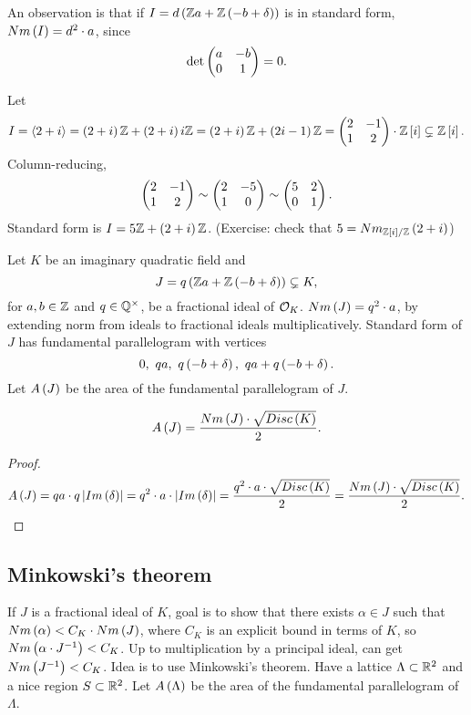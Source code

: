 An observation is that if $ I = d\left( \mathbb{Z} a + \mathbb{Z}\left( -b + \delta \right) \right) $ is in standard form, $ Nm\left( I \right) = d^2 \cdot a $, since
$$ \det\begin{pmatrix} a & -b \\ 0 & 1 \end{pmatrix} = 0. $$

\pagebreak


\begin{example*}
Let
$$ I = \left\langle 2 + i \right\rangle = \left( 2 + i \right)\mathbb{Z} + \left( 2 + i \right)i\mathbb{Z} = \left( 2 + i \right)\mathbb{Z} + \left( 2i - 1 \right)\mathbb{Z} = \begin{pmatrix} 2 & -1 \\ 1 & 2 \end{pmatrix} \cdot \mathbb{Z}\left[ i \right] \subsetneq \mathbb{Z}\left[ i \right]. $$
Column-reducing,
$$ \begin{pmatrix} 2 & -1 \\ 1 & 2 \end{pmatrix} \sim \begin{pmatrix} 2 & -5 \\ 1 & 0 \end{pmatrix} \sim \begin{pmatrix} 5 & 2 \\ 0 & 1 \end{pmatrix}. $$
Standard form is $ I = 5\mathbb{Z} + \left( 2 + i \right)\mathbb{Z} $. (Exercise: check that $ 5 = Nm_{\mathbb{Z}\left[ i \right] / \mathbb{Z}}\left( 2 + i \right) $)
\end{example*}

Let $ K $ be an imaginary quadratic field and
$$ J = q\left( \mathbb{Z} a + \mathbb{Z}\left( -b + \delta \right) \right) \subsetneq K, $$
for $ a, b \in \mathbb{Z} $ and $ q \in \mathbb{Q}^\times $, be a fractional ideal of $ \mathcal{O}_K $. $ Nm\left( J \right) = q^2 \cdot a $, by extending norm from ideals to fractional ideals multiplicatively. Standard form of $ J $ has fundamental parallelogram with vertices
$$ 0, \ qa, \ q\left( -b + \delta \right), \ qa + q\left( -b + \delta \right). $$
Let $ A\left( J \right) $ be the area of the fundamental parallelogram of $ J $.

\begin{proposition}
$$ A\left( J \right) = \dfrac{Nm\left( J \right) \cdot \sqrt{Disc\left( K \right)}}{2}. $$
\end{proposition}

\begin{proof}
$$ A\left( J \right) = qa \cdot q\left\lvert Im\left( \delta \right) \right\rvert = q^2 \cdot a \cdot \left\lvert Im\left( \delta \right) \right\rvert = \dfrac{q^2 \cdot a \cdot \sqrt{Disc\left( K \right)}}{2} = \dfrac{Nm\left( J \right) \cdot \sqrt{Disc\left( K \right)}}{2}. $$
\end{proof}

\subsection{Minkowski's theorem}

If $ J $ is a fractional ideal of $ K $, goal is to show that there exists $ \alpha \in J $ such that $ Nm\left( \alpha \right) < C_K \cdot Nm\left( J \right) $, where $ C_K $ is an explicit bound in terms of $ K $, so $ Nm\left( \alpha \cdot J^{-1} \right) < C_K $. Up to multiplication by a principal ideal, can get $ Nm\left( J^{-1} \right) < C_K $. Idea is to use Minkowski's theorem. Have a lattice $ \Lambda \subset \mathbb{R}^2 $ and a nice region $ S \subset \mathbb{R}^2 $. Let $ A\left( \Lambda \right) $ be the area of the fundamental parallelogram of $ \Lambda $.

